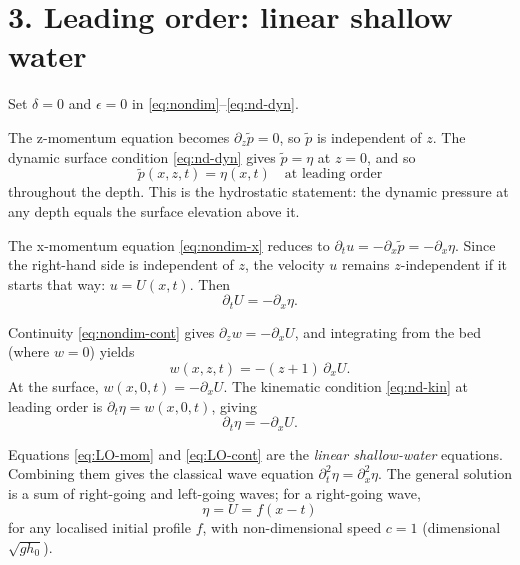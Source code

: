 \documentclass{article}
\begin{document}
\section*{3. Leading order: linear shallow water}

Set \(\delta = 0\) and \(\epsilon = 0\) in \eqref{eq:nondim}--\eqref{eq:nd-dyn}.

The z-momentum equation becomes \(\partial_z \tilde p = 0\), so \(\tilde p\) is independent of \(z\). The dynamic surface condition \eqref{eq:nd-dyn} gives \(\tilde p = \eta\) at \(z = 0\), and so
\begin{equation}
\tilde p(x, z, t) = \eta(x, t) \quad \text{at leading order}
\label{eq:LO-p}
\end{equation}
throughout the depth. This is the hydrostatic statement: the dynamic pressure at any depth equals the surface elevation above it.

The x-momentum equation \eqref{eq:nondim-x} reduces to \(\partial_t u = -\partial_x \tilde p = -\partial_x \eta\). Since the right-hand side is independent of \(z\), the velocity \(u\) remains \(z\)-independent if it starts that way: \(u = U(x, t)\). Then
\begin{equation}
\partial_t U = -\partial_x \eta.
\label{eq:LO-mom}
\end{equation}

Continuity \eqref{eq:nondim-cont} gives \(\partial_z w = -\partial_x U\), and integrating from the bed (where \(w=0\)) yields
\begin{equation}
w(x, z, t) = -(z + 1)\, \partial_x U.
\label{eq:LO-w}
\end{equation}
At the surface, \(w(x, 0, t) = -\partial_x U\). The kinematic condition \eqref{eq:nd-kin} at leading order is \(\partial_t \eta = w(x, 0, t)\), giving
\begin{equation}
\partial_t \eta = -\partial_x U.
\label{eq:LO-cont}
\end{equation}

Equations \eqref{eq:LO-mom} and \eqref{eq:LO-cont} are the \emph{linear shallow-water} equations. Combining them gives the classical wave equation \(\partial_t^2 \eta = \partial_x^2 \eta\). The general solution is a sum of right-going and left-going waves; for a right-going wave,
\begin{equation}
\eta = U = f(x - t)
\label{eq:right-going}
\end{equation}
for any localised initial profile \(f\), with non-dimensional speed \(c = 1\) (dimensional \(\sqrt{g h_0}\)).
\end{document}
